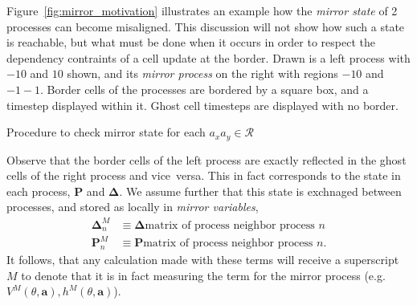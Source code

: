 Figure~\ref{fig:mirror_motivation} illustrates an example how the {\it mirror state}
of 2 processes can become misaligned.  This discussion will not show how such a state
is reachable, but what must be done when it occurs in order to respect the dependency
contraints of a cell update at the border.
Drawn is a left process with $-10$ and $10$ shown,
and its {\it mirror process} on the right with regions $-10$ and $-1-1$.  Border cells
of the processes are bordered by a square box, and a timestep displayed within it.
Ghost cell timesteps are displayed with no border.
\begin{algorithm}[h]
  \setcounter{AlgoLine}{0}
  \caption{Procedure to check mirror state for each
  $a_xa_y \in \mathcal{R}$}
  \label{alg:mirror_guard}
\end{algorithm}
Observe that the border cells
of the left process are exactly reflected in the ghost cells of the right process and
vice~versa.  This in fact corresponds to the state in each process, $\mathbf{P}$ and
$\mathbf{\Delta}$.  We assume further that this state is exchnaged between processes,
and stored as locally in {\it mirror variables},
\begin{eqnarray}
  \mathbf{\Delta}_n^M &\equiv \mathbf{\Delta} \text{matrix of process neighbor process $n$}\\
  \mathbf{P}_n^M &\equiv \mathbf{P} \text{matrix of process neighbor process $n$}.
\end{eqnarray}
It follows, that any calculation made with these terms will receive a superscript $M$
to denote that it is in fact measuring the term for the mirror process (e.g.
$V^M(\theta, \mathbf{a}), h^M(\theta, \mathbf{a})$).

